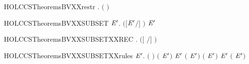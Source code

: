 \newcommand{\HOLCCSTheoremsBVXXrelab}{\UseVerbatim{HOLCCSTheoremsBVXXrelab}}
\begin{SaveVerbatim}{HOLCCSTheoremsBVXXrestr}
\HOLTokenTurnstile{} \HOLSymConst{\HOLTokenForall{}} .  \ensuremath{(}  \ensuremath{)} \HOLSymConst{\ensuremath{=}}  
\end{SaveVerbatim}
\newcommand{\HOLCCSTheoremsBVXXrestr}{\UseVerbatim{HOLCCSTheoremsBVXXrestr}}
\begin{SaveVerbatim}{HOLCCSTheoremsBVXXSUBSET}
\HOLTokenTurnstile{} \HOLSymConst{\HOLTokenForall{}}  \ensuremath{\HOLBoundVar{E}\sp{\prime}}.  \ensuremath{(}\ensuremath{[}\ensuremath{\HOLBoundVar{E}\sp{\prime}}\ensuremath{/}\ensuremath{]} \ensuremath{)} \HOLConst{\HOLTokenSubset{}}   \HOLConst{\HOLTokenUnion{}}  \ensuremath{\HOLBoundVar{E}\sp{\prime}}
\end{SaveVerbatim}
\newcommand{\HOLCCSTheoremsBVXXSUBSET}{\UseVerbatim{HOLCCSTheoremsBVXXSUBSET}}
\begin{SaveVerbatim}{HOLCCSTheoremsBVXXSUBSETXXREC}
\HOLTokenTurnstile{} \HOLSymConst{\HOLTokenForall{}} .  \ensuremath{(}\ensuremath{[}  \ensuremath{/}\ensuremath{]} \ensuremath{)} \HOLConst{\HOLTokenSubset{}}    
\end{SaveVerbatim}
\newcommand{\HOLCCSTheoremsBVXXSUBSETXXREC}{\UseVerbatim{HOLCCSTheoremsBVXXSUBSETXXREC}}
\begin{SaveVerbatim}{HOLCCSTheoremsBVXXSUBSETXXrules}
\HOLTokenTurnstile{} \HOLSymConst{\HOLTokenForall{}}  \ensuremath{\HOLBoundVar{E}\sp{\prime}}.
         \HOLConst{\HOLTokenSubset{}}  \ensuremath{(}  \ensuremath{)} \HOLSymConst{\HOLTokenConj{}}   \HOLConst{\HOLTokenSubset{}}  \ensuremath{(} \HOLSymConst{\ensuremath{+}} \ensuremath{\HOLBoundVar{E}\sp{\prime}}\ensuremath{)} \HOLSymConst{\HOLTokenConj{}}
        \ensuremath{\HOLBoundVar{E}\sp{\prime}} \HOLConst{\HOLTokenSubset{}}  \ensuremath{(} \HOLSymConst{\ensuremath{+}} \ensuremath{\HOLBoundVar{E}\sp{\prime}}\ensuremath{)} \HOLSymConst{\HOLTokenConj{}}   \HOLConst{\HOLTokenSubset{}}  \ensuremath{(} \HOLSymConst{\ensuremath{\mid}} \ensuremath{\HOLBoundVar{E}\sp{\prime}}\ensuremath{)} \HOLSymConst{\HOLTokenConj{}}
        \ensuremath{\HOLBoundVar{E}\sp{\prime}} \HOLConst{\HOLTokenSubset{}}  \ensuremath{(} \HOLSymConst{\ensuremath{\mid}} \ensuremath{\HOLBoundVar{E}\sp{\prime}}\ensuremath{)}
\end{SaveVerbatim}
